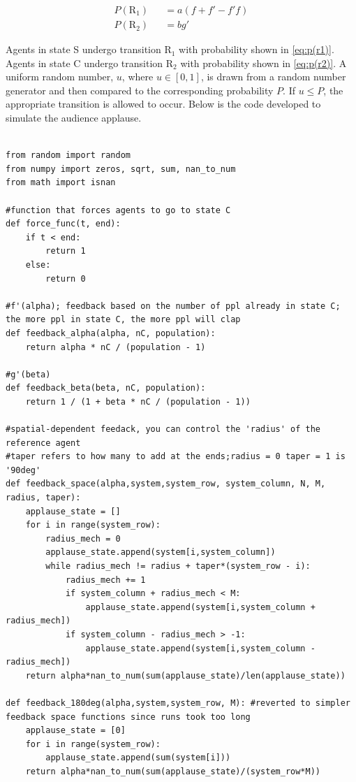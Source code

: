 \begin{eqnarray}
P(\mathrm{R}_{1}) &&= a(f + f' - f'f) \label{eq:p(r1)} \\
P(\mathrm{R}_{2}) &&= bg' \label{eq:p(r2)}
\end{eqnarray}

Agents in state S undergo transition $\mathrm{R}_{1}$ with probability shown in \ref{eq:p(r1)}.
Agents in state C undergo transition $\mathrm{R}_{2}$ with probability shown in \ref{eq:p(r2)}.
A uniform random number, $u$, where $u \in [0,1]$, is drawn from a random number generator and then compared to the corresponding probability $P$.
If $u \leq P$, the appropriate transition is allowed to occur.
Below is the code developed to simulate the audience applause.


\begin{lstlisting}

from random import random
from numpy import zeros, sqrt, sum, nan_to_num
from math import isnan

#function that forces agents to go to state C
def force_func(t, end):
    if t < end:
        return 1
    else:
        return 0

#f'(alpha); feedback based on the number of ppl already in state C; the more ppl in state C, the more ppl will clap
def feedback_alpha(alpha, nC, population):
    return alpha * nC / (population - 1)
    
#g'(beta)
def feedback_beta(beta, nC, population):
    return 1 / (1 + beta * nC / (population - 1))
       
#spatial-dependent feedack, you can control the 'radius' of the reference agent
#taper refers to how many to add at the ends;radius = 0 taper = 1 is '90deg'    
def feedback_space(alpha,system,system_row, system_column, N, M, radius, taper):
    applause_state = []
    for i in range(system_row):
        radius_mech = 0
        applause_state.append(system[i,system_column])
        while radius_mech != radius + taper*(system_row - i):
            radius_mech += 1
            if system_column + radius_mech < M:
                applause_state.append(system[i,system_column + radius_mech])
            if system_column - radius_mech > -1:
                applause_state.append(system[i,system_column - radius_mech])
    return alpha*nan_to_num(sum(applause_state)/len(applause_state))
    
def feedback_180deg(alpha,system,system_row, M): #reverted to simpler feedback space functions since runs took too long
    applause_state = [0]
    for i in range(system_row):
        applause_state.append(sum(system[i]))
    return alpha*nan_to_num(sum(applause_state)/(system_row*M))    


\end{lstlisting}
